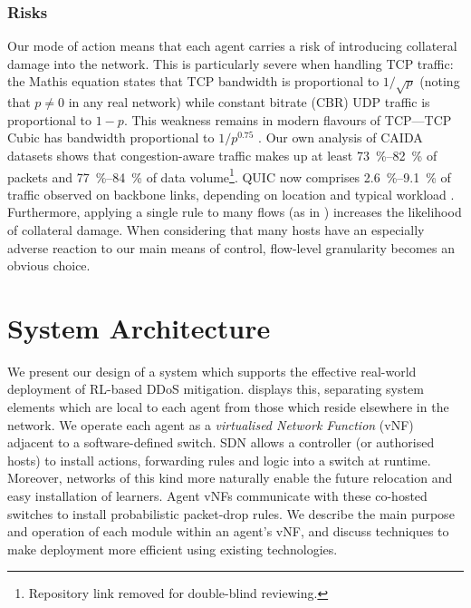 \documentclass[10pt, times, conference, letterpaper]{IEEEtran}
\begin{document}
\subsubsection{Risks}
Our mode of action means that each agent carries a risk of introducing collateral damage into the network.
This is particularly severe when handling TCP traffic: the Mathis equation \cite{DBLP:journals/ccr/MathisSMO97} states that TCP bandwidth is proportional to $1/\sqrt{p}$ (noting that $p\ne0$ in any real network) while constant bitrate (CBR) UDP traffic is proportional to $1 - p$.
This weakness remains in modern flavours of TCP---TCP Cubic has bandwidth proportional to $1/p^{0.75}$ \cite{rfc8312}.
Our own analysis of CAIDA datasets \cite{caida-2018-passive} shows that congestion-aware traffic makes up at least \SIrange{73}{82}{\percent} of packets and \SIrange{77}{84}{\percent} of data volume\footnote{Repository link removed for double-blind reviewing.}.
QUIC now comprises \SIrange{2.6}{9.1}{\percent} of traffic observed on backbone links, depending on location and typical workload \cite{DBLP:conf/pam/RuthPDH18}.
Furthermore, applying a single rule to many flows (as in \textcite{DBLP:journals/eaai/MalialisK15}) increases the likelihood of collateral damage.
When considering that many hosts have an especially adverse reaction to our main means of control, flow-level granularity becomes an obvious choice.

\section{System Architecture}\label{sec:system-architecture}

We present our design of a system which supports the effective real-world deployment of RL-based DDoS mitigation.
 displays this, separating system elements which are local to each agent from those which reside elsewhere in the network.
We operate each agent as a \emph{virtualised Network Function} (vNF) adjacent to a software-defined switch.
SDN allows a controller (or authorised hosts) to install actions, forwarding rules and logic into a switch at runtime.
Moreover, networks of this kind more naturally enable the future relocation and easy installation of learners.
Agent vNFs communicate with these co-hosted switches to install probabilistic packet-drop rules.
We describe the main purpose and operation of each module within an agent's vNF, and discuss techniques to make deployment more efficient using existing technologies.
\end{document}
